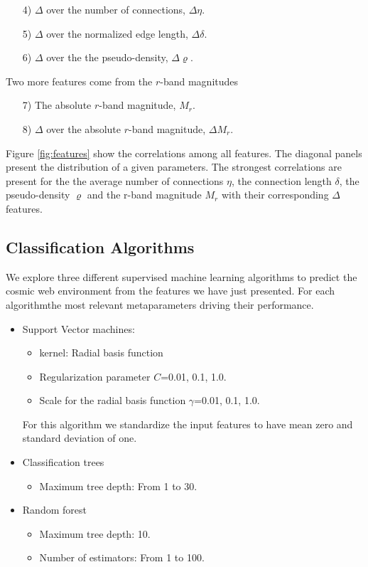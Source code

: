 \documentclass[usenatbib]{mnras}
\begin{document}
\begin{enumerate}
\item[4)] $\Delta$ over the number of connections, $\Delta\eta$.
\item[5)] $\Delta$ over the normalized edge length, $\Delta\delta$.
\item[6)] $\Delta$ over the the pseudo-density, $\Delta\varrho$.
\end{enumerate}

\noindent
Two more features come from the $r$-band magnitudes
\begin{enumerate}
\item[7)] The absolute $r$-band magnitude, $M_r$.
\item[8)] $\Delta$ over the absolute $r$-band magnitude, $\Delta M_r$.
\end{enumerate}

Figure \ref{fig:features} show the correlations among all features.
The diagonal panels present the distribution of a given parameters.
The strongest correlations are present for the the average number of
connections $\eta$, the connection length $\delta$, the
pseudo-density $\varrho$ and the r-band magnitude $M_r$ with their
corresponding $\Delta$ features.



\subsection{Classification Algorithms}

We explore three different supervised machine learning algorithms to
predict the cosmic web environment from the features we have just
presented. 
For each algorithmthe most relevant metaparameters driving their
performance.

\begin{itemize}
    \item Support Vector machines: 
        \begin{itemize}
            \item kernel: Radial basis function
            \item Regularization parameter $C$=0.01, 0.1, 1.0.
            \item Scale for the radial basis function  $\gamma$=0.01, 0.1, 1.0.
        \end{itemize}
        For this algorithm we standardize the input features to have
        mean zero and standard deviation of one. 
    \item Classification trees
      \begin{itemize}
      \item Maximum tree depth: From 1 to 30.
      \end{itemize}
    \item Random forest
        \begin{itemize}
            \item Maximum tree depth: 10.
            \item Number of estimators: From 1 to 100.
        \end{itemize}
\end{itemize}
\end{document}
